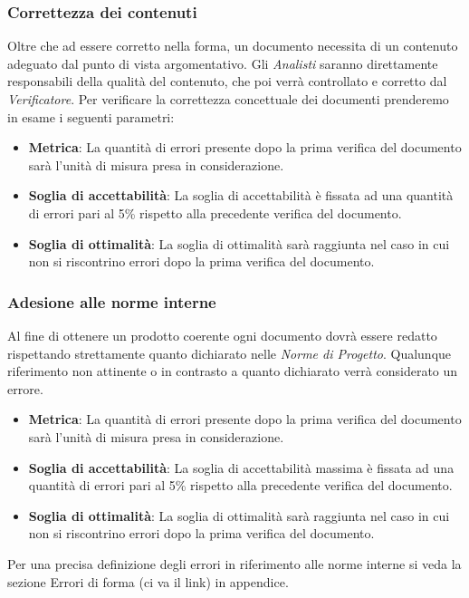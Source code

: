 \subsubsection{Correttezza dei contenuti}
Oltre che ad essere corretto nella forma, un documento necessita di un contenuto adeguato dal punto di vista argomentativo. Gli \emph{Analisti} saranno direttamente responsabili della qualità del contenuto, che poi verrà controllato e corretto dal \emph{Verificatore}.
Per verificare la correttezza concettuale dei documenti prenderemo in esame i seguenti parametri:
\begin{itemize}
	\item \textbf{Metrica}: La quantità di errori presente dopo la prima verifica del documento sarà l'unità di misura presa in considerazione.
	\item \textbf{Soglia di accettabilità}: La soglia di accettabilità è fissata ad una quantità di errori pari al 5\% rispetto alla precedente verifica del documento.
	\item \textbf{Soglia di ottimalità}: La soglia di ottimalità sarà raggiunta nel caso in cui non si riscontrino errori dopo la prima verifica del documento.
\end{itemize}
\subsubsection{Adesione alle norme interne}
Al fine di ottenere un prodotto coerente ogni documento dovrà essere redatto rispettando strettamente quanto dichiarato nelle \emph{Norme di Progetto}.
Qualunque riferimento non attinente o in contrasto a quanto dichiarato verrà considerato un errore.
\begin{itemize}
	\item \textbf{Metrica}: La quantità di errori presente dopo la prima verifica del documento sarà l'unità di misura presa in considerazione. 
	\item \textbf{Soglia di accettabilità}: La soglia di accettabilità massima è fissata ad una quantità di errori pari al 5\% rispetto alla precedente verifica del documento.
	\item \textbf{Soglia di ottimalità}: La soglia di ottimalità sarà raggiunta nel caso in cui non si riscontrino errori dopo la prima verifica del documento.
\end{itemize}
Per una precisa definizione degli errori in riferimento alle norme interne si veda la sezione Errori di forma (ci va il link) in appendice.

